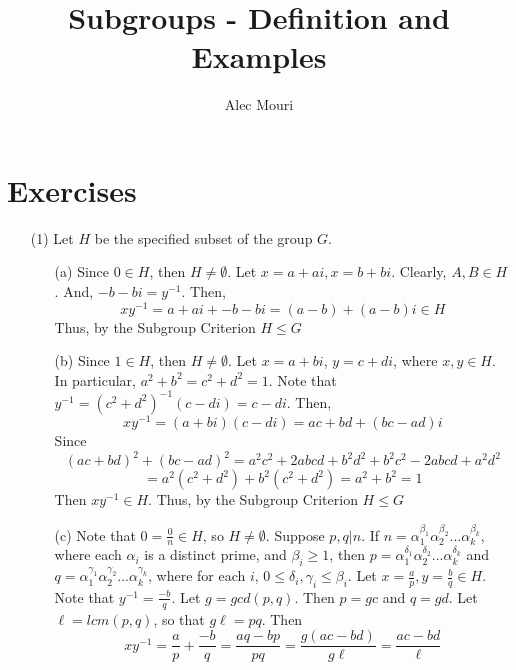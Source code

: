 \documentclass[12pt]{article}
\begin{document}
\title{Subgroups - Definition and Examples}
\author{Alec Mouri}

\maketitle
\section*{Exercises}
\begin{itemize}
\item[(1)]
Let $H$ be the specified subset of the group $G$.
\begin{itemize}
\item[(a)]
Since $0 \in H$, then $H \neq \emptyset$. Let $x = a + ai, x = b + bi$. Clearly, $A, B \in H$. And, $-b - bi = y^{-1}$. Then, 
$$xy^{-1} = a + ai + -b - bi = (a-b) + (a-b)i \in H$$
Thus, by the Subgroup Criterion $H \leq G$
\item[(b)]
Since $1 \in H$, then $H \neq \emptyset$. Let $x = a + bi$, $y = c + di$, where $x, y \in H$. In particular, $a^2 + b^2 = c^2 + d^2 = 1$. Note that $y^{-1} = (c^2 + d^2)^{-1}(c - di) = c - di$. Then,
$$xy^{-1} = (a + bi)(c - di) = ac + bd + (bc - ad)i$$
Since 
$$(ac + bd)^2 + (bc - ad)^2 = a^2c^2 + 2abcd + b^2d^2 + b^2c^2 - 2abcd + a^2d^2$$ 
$$= a^2(c^2 + d^2) + b^2(c^2 + d^2) = a^2 + b^2 = 1$$
Then $xy^{-1} \in H$. Thus, by the Subgroup Criterion $H \leq G$
\item[(c)]
Note that $0 = \frac{0}{n} \in H$, so $H \neq \emptyset$. Suppose $p, q | n$. If $n = \alpha_1^{\beta_1}\alpha_2^{\beta_2}...\alpha_k^{\beta_k}$, where each $\alpha_i$ is a distinct prime, and $\beta_i \geq 1$, then $p = \alpha_1^{\delta_1}\alpha_2^{\delta_2}...\alpha_k^{\delta_k}$ and $q = \alpha_1^{\gamma_1}\alpha_2^{\gamma_2}...\alpha_k^{\gamma_k}$, where for each $i$, $0 \leq \delta_i, \gamma_i \leq \beta_i$. Let $x = \frac{a}{p}, y = \frac{b}{q} \in H$. Note that $y^{-1} = \frac{-b}{q}$. Let $g = gcd(p, q)$. Then $p = gc$ and $q = gd$. Let $\ell = lcm(p, q)$, so that $g\ell = pq$. Then
$$xy^{-1} =  \frac{a}{p} + \frac{-b}{q} = \frac{aq - bp}{pq} = \frac{g(ac - bd)}{g\ell} = \frac{ac - bd}{\ell}$$


\end{itemize}
\end{itemize}
\end{document}
